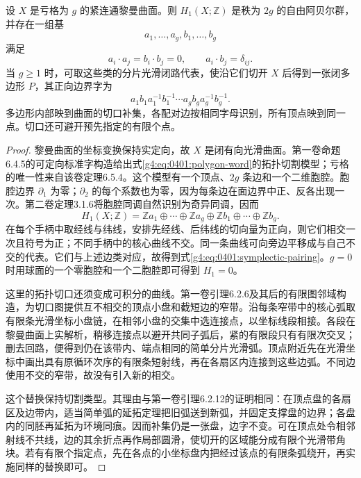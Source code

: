 \begin{proposition}
	\label{g4:prop:0401:symplectic-basis}
	设 \(X\) 是亏格为 \(g\) 的紧连通黎曼曲面。则 \(H_1(X;\mathbb Z)\) 是秩为 \(2g\) 的自由阿贝尔群，并存在一组基
	\[
		a_1,\ldots,a_g,b_1,\ldots,b_g
	\]
	满足
	\begin{equation}\label{g4:eq:0401:symplectic-pairing}
		a_i\cdot a_j=b_i\cdot b_j=0,
		\qquad a_i\cdot b_j=\delta_{ij}.
	\end{equation}
	当 \(g\ge1\) 时，可取这些类的分片光滑闭路代表，使沿它们切开 \(X\) 后得到一张闭多边形 \(P\)，其正向边界字为
	\begin{equation}\label{g4:eq:0401:polygon-word}
		a_1b_1a_1^{-1}b_1^{-1}\cdots
		a_gb_ga_g^{-1}b_g^{-1}.
	\end{equation}
	多边形内部映到曲面的切口补集，各配对边按相同字母识别，所有顶点映到同一点。切口还可避开预先指定的有限个点。
\end{proposition}
\begin{proof}
	黎曼曲面的坐标变换保持实定向，故 \(X\) 是闭有向光滑曲面。第一卷命题6.4.5的可定向标准字构造给出式\eqref{g4:eq:0401:polygon-word}的拓扑切割模型；亏格的唯一性来自该卷定理6.5.4。这个模型有一个顶点、\(2g\) 条边和一个二维胞腔。胞腔边界 \(\partial_1\) 为零；\(\partial_2\) 的每个系数也为零，因为每条边在面边界中正、反各出现一次。第二卷定理3.1.6将胞腔同调自然识别为奇异同调，因而
	\[
		H_1(X;\mathbb Z)=\mathbb Z a_1\oplus\cdots\oplus\mathbb Z a_g
		\oplus\mathbb Z b_1\oplus\cdots\oplus\mathbb Z b_g.
	\]
	在每个手柄中取经线与纬线，安排先经线、后纬线的切向量为正向，则它们相交一次且符号为正；不同手柄中的核心曲线不交。同一条曲线可向旁边平移成与自己不交的代表。它们与上述边类对应，故得到式\eqref{g4:eq:0401:symplectic-pairing}。\(g=0\) 时用球面的一个零胞腔和一个二胞腔即可得到 \(H_1=0\)。

	这里的拓扑切口还须变成可积分的曲线。第一卷引理6.2.6及其后的有限图邻域构造，为切口图提供互不相交的顶点小盘和截短边的窄带。沿每条窄带中的核心弧取有限条光滑坐标小盘链，在相邻小盘的交集中选连接点，以坐标线段相接。各段在黎曼曲面上实解析，稍移连接点以避开共同子弧后，紧的有限段只有有限次交叉；删去回路，便得到仍在该带内、端点相同的简单分片光滑弧。顶点附近先在光滑坐标中画出具有原循环次序的有限条短射线，再在各扇区内连接到这些边弧。不同边使用不交的窄带，故没有引入新的相交。

	这个替换保持切割类型。其理由与第一卷引理6.2.12的证明相同：在顶点盘的各扇区及边带内，适当简单弧的延拓定理把旧弧送到新弧，并固定支撑盘的边界；各盘内的同胚再延拓为环境同痕。因而补集仍是一张盘，边字不变。可在顶点处令相邻射线不共线，边的其余折点再作局部圆滑，使切开的区域能分成有限个光滑带角块。若有有限个指定点，先在各点的小坐标盘内把经过该点的有限条弧绕开，再实施同样的替换即可。
\end{proof}

